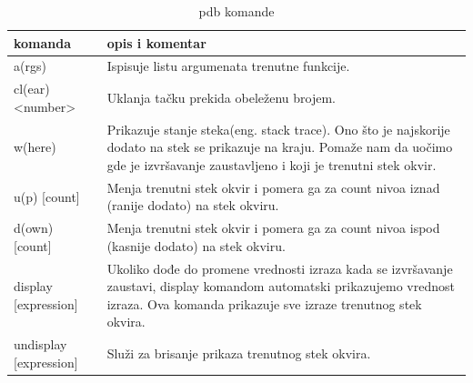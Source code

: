 \documentclass[a4paper]{article}
\begin{document}
\begin{table}[h!]
\begin{center}
\caption{pdb komande}
 \begin{tabular}{||p{4cm} p{7cm}||} 
 \hline
  komanda &      opis i komentar \\ [2.0ex] 
 \hline\hline
  a(rgs) & Ispisuje listu argumenata trenutne funkcije.  \\  [2ex]   
 \hline
 cl(ear) <number> & Uklanja tačku prekida obeleženu brojem.  \\ [2ex]
 \hline
 w(here) & Prikazuje stanje steka(eng. stack trace). Ono što je najskorije dodato na stek se prikazuje na kraju. Pomaže nam da uočimo gde je izvršavanje zaustavljeno i koji je trenutni stek okvir. \\ [2ex]
 \hline
 u(p) [count] & Menja trenutni stek okvir i pomera ga za count nivoa iznad (ranije dodato) na stek okviru.  \\ [2ex]
  \hline
 d(own) [count] & Menja trenutni stek okvir i pomera ga za count nivoa ispod (kasnije dodato) na stek okviru.  \\ [2ex] 
 \hline
  \hline
 display [expression] & Ukoliko dođe do promene vrednosti izraza kada se izvršavanje zaustavi, display komandom automatski prikazujemo vrednost izraza. Ova komanda prikazuje sve izraze trenutnog stek okvira.\\ [2ex] 
 \hline
 \hline
 undisplay [expression] & Služi za brisanje prikaza trenutnog stek okvira.  \\ [2ex] 
 \hline
\end{tabular}
\label{tab:tabela1}
\end{center}
\end{table}
\end{document}
